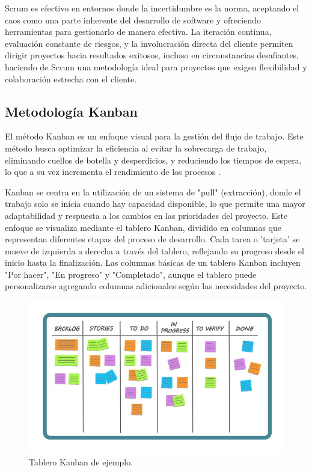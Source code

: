 Scrum es efectivo en entornos donde la incertidumbre es la norma, aceptando el caos como una parte inherente del desarrollo de software y ofreciendo herramientas para gestionarlo de manera efectiva. La iteración continua, evaluación constante de riesgos, y la involucración directa del cliente permiten dirigir proyectos hacia resultados exitosos, incluso en circunstancias desafiantes, haciendo de Scrum una metodología ideal para proyectos que exigen flexibilidad y colaboración estrecha con el cliente.

\subsection{Metodología Kanban}

El método Kanban es un enfoque visual para la gestión del flujo de trabajo. Este método busca optimizar la eficiencia al evitar la sobrecarga de trabajo, eliminando cuellos de botella y desperdicios, y reduciendo los tiempos de espera, lo que a su vez incrementa el rendimiento de los procesos \cite{alaidaros2021kanban}.

Kanban se centra en la utilización de un sistema de "pull" (extracción), donde el trabajo solo se inicia cuando hay capacidad disponible, lo que permite una mayor adaptabilidad y respuesta a los cambios en las prioridades del proyecto. Este enfoque se visualiza mediante el tablero Kanban, dividido en columnas que representan diferentes etapas del proceso de desarrollo. Cada tarea o 'tarjeta' se mueve de izquierda a derecha a través del tablero, reflejando su progreso desde el inicio hasta la finalización. Las columnas básicas de un tablero Kanban incluyen "Por hacer", "En progreso" y "Completado", aunque el tablero puede personalizarse agregando columnas adicionales según las necesidades del proyecto.

\begin{figure}[h]
	\centering
	\includegraphics[width=\linewidth]{Figures/model-kanban.png}
	\caption{Tablero Kanban de ejemplo.}
\end{figure}

